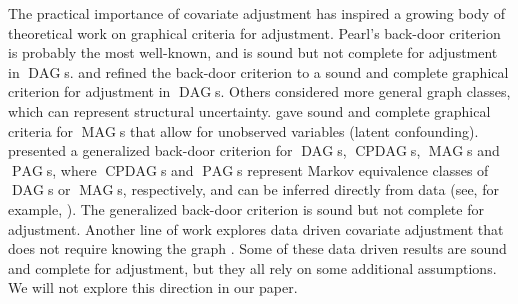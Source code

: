 \documentclass[11pt,a4paper]{article}
\DeclareMathOperator{\CPDAG}{CPDAG}
\DeclareMathOperator{\DAG}{DAG}
\DeclareMathOperator{\MAG}{MAG}
\DeclareMathOperator{\PAG}{PAG}
\begin{document}
The practical importance of covariate adjustment has inspired
a growing body of theoretical work on graphical criteria for adjustment.
Pearl's back-door criterion \citep{pearl1993bayesian} is probably the most well-known, and is
sound but not complete for adjustment in $\DAG$s.
\citet{shpitser2012validity} and \citet{shpitser2012avalidity} refined the back-door criterion to a sound and complete graphical criterion
for adjustment in $\DAG$s.
Others considered more general graph classes, which can represent structural uncertainty.
 gave sound and complete graphical criteria for $\MAG$s that
 allow for unobserved variables (latent confounding). \citet{maathuis2013generalized}
presented a generalized back-door criterion for $\DAG$s, $\CPDAG$s, $\MAG$s and $\PAG$s,
where $\CPDAG$s and $\PAG$s represent Markov equivalence classes of $\DAG$s or $\MAG$s, respectively,
and can be inferred directly from data (see, for example, \citealp{spirtes2000causation, Chickering02-optimal, Colombo2012, ClaassenMooijHeskes13, colombo2014order, nandyMaathuisArges, frot2017learning, heinze2017causal}). The generalized back-door criterion
is sound but not complete for adjustment. Another line of work explores data driven covariate adjustment that does not require knowing the graph \citep{vanderweele2011new,DeLunaEtAl11,EntnerHoyerSpirtes13}. Some of these data driven results are sound and complete for adjustment, but they all rely on some additional assumptions. We will not explore this direction in our paper.
\end{document}
